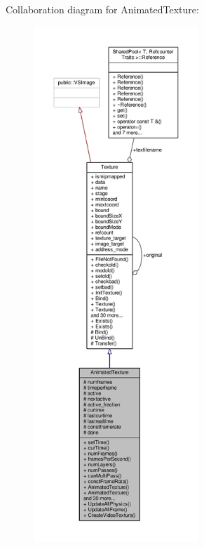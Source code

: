 Collaboration diagram for Animated\+Texture\+:
\nopagebreak
\begin{figure}[H]
\begin{center}
\leavevmode
\includegraphics[height=550pt]{d5/dcb/classAnimatedTexture__coll__graph}
\end{center}
\end{figure}
